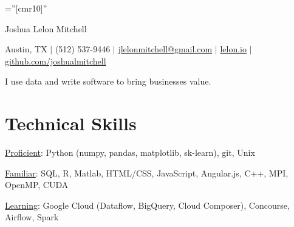 \documentclass[a4paper,10pt]{article}
\begin{document}

\pagestyle{empty} %

\font\fb=''[cmr10]'' %

\par{\centering
		{\Huge Joshua Lelon Mitchell
	}\par}
\par{\centering
		{
	Austin, TX
	$\mid$
	(512) 537-9446
	$\mid$
	\href {mailto:jlelonmitchell@gmail.com}{jlelonmitchell@gmail.com}
	$\mid$
	\href {http://lelon.io/blog/2018/01/04/to-potential-employers}{lelon.io}
	$\mid$
	\href {https://github.com/joshualmitchell}{github.com/joshualmitchell}
}\par}

\begin{center}
I use data and write software to bring businesses value.
\end{center}
\section{Technical Skills}

\underline{Proficient}: Python (numpy, pandas, matplotlib, sk-learn), git, Unix

\underline{Familiar}: SQL, R, Matlab, HTML/CSS, JavaScript, Angular.js, C++, MPI, OpenMP, CUDA

\underline{Learning}: Google Cloud (Dataflow, BigQuery, Cloud Composer), Concourse, Airflow, Spark

\end{document}
